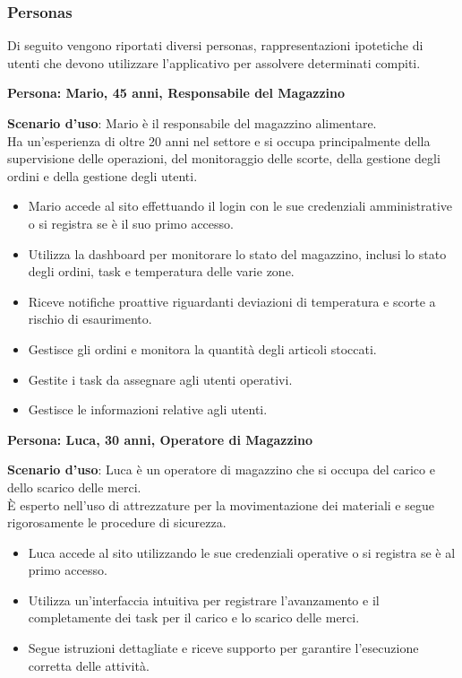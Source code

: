 \subsubsection{Personas}

Di seguito vengono riportati diversi personas, rappresentazioni ipotetiche di utenti che devono utilizzare l’applicativo per assolvere determinati compiti.

\textbf{Persona: Mario, 45 anni, Responsabile del Magazzino}

\textbf{Scenario d’uso}: Mario è il responsabile del magazzino alimentare.\\
Ha un'esperienza di oltre 20 anni nel settore e si occupa principalmente della supervisione delle operazioni,
del monitoraggio delle scorte, della gestione degli ordini e della gestione degli utenti.

\begin{itemize}
    \item Mario accede al sito effettuando il login con le sue credenziali amministrative o si registra se è il suo primo accesso.
    \item Utilizza la dashboard per monitorare lo stato del magazzino, inclusi lo stato degli ordini, task e temperatura delle varie zone.
    \item Riceve notifiche proattive riguardanti deviazioni di temperatura e scorte a rischio di esaurimento.
    \item Gestisce gli ordini e monitora la quantità degli articoli stoccati.
    \item Gestite i task da assegnare agli utenti operativi.
    \item Gestisce le informazioni relative agli utenti.
\end{itemize}

\textbf{Persona: Luca, 30 anni, Operatore di Magazzino}

\textbf{Scenario d’uso}: Luca è un operatore di magazzino che si occupa del carico e dello scarico delle merci.\\È esperto nell'uso di attrezzature per la movimentazione dei materiali e segue rigorosamente le procedure di sicurezza.

\begin{itemize}
    \item Luca accede al sito utilizzando le sue credenziali operative o si registra se è al primo accesso.
    \item Utilizza un’interfaccia intuitiva per registrare l'avanzamento e il completamente dei task per il carico e lo scarico delle merci.
    \item Segue istruzioni dettagliate e riceve supporto per garantire l’esecuzione corretta delle attività.
\end{itemize}

